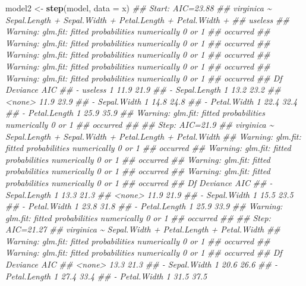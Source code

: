 \documentclass[
  notitlepage]{book}
\newenvironment{Shaded}{\begin{snugshade}}{\end{snugshade}}
\newcommand{\CommentTok}[1]{\textcolor[rgb]{0.56,0.35,0.01}{\textit{#1}}}
\newcommand{\DataTypeTok}[1]{\textcolor[rgb]{0.13,0.29,0.53}{#1}}
\newcommand{\KeywordTok}[1]{\textcolor[rgb]{0.13,0.29,0.53}{\textbf{#1}}}
\newcommand{\NormalTok}[1]{#1}
\newcommand{\StringTok}[1]{\textcolor[rgb]{0.31,0.60,0.02}{#1}}
\begin{document}
\begin{Shaded}
\begin{Highlighting}[]
\NormalTok{model2 \textless{}{-}}\StringTok{ }\KeywordTok{step}\NormalTok{(model, }\DataTypeTok{data =}\NormalTok{ x)}
\CommentTok{\#\# Start:  AIC=23.88}
\CommentTok{\#\# virginica \textasciitilde{} Sepal.Length + Sepal.Width + Petal.Length + Petal.Width + }
\CommentTok{\#\#     useless}
\CommentTok{\#\# Warning: glm.fit: fitted probabilities numerically 0 or 1}
\CommentTok{\#\# occurred}
\CommentTok{\#\# Warning: glm.fit: fitted probabilities numerically 0 or 1}
\CommentTok{\#\# occurred}
\CommentTok{\#\# Warning: glm.fit: fitted probabilities numerically 0 or 1}
\CommentTok{\#\# occurred}
\CommentTok{\#\# Warning: glm.fit: fitted probabilities numerically 0 or 1}
\CommentTok{\#\# occurred}
\CommentTok{\#\# Warning: glm.fit: fitted probabilities numerically 0 or 1}
\CommentTok{\#\# occurred}
\CommentTok{\#\#                Df Deviance  AIC}
\CommentTok{\#\# {-} useless       1     11.9 21.9}
\CommentTok{\#\# {-} Sepal.Length  1     13.2 23.2}
\CommentTok{\#\# \textless{}none\textgreater{}                11.9 23.9}
\CommentTok{\#\# {-} Sepal.Width   1     14.8 24.8}
\CommentTok{\#\# {-} Petal.Width   1     22.4 32.4}
\CommentTok{\#\# {-} Petal.Length  1     25.9 35.9}
\CommentTok{\#\# Warning: glm.fit: fitted probabilities numerically 0 or 1}
\CommentTok{\#\# occurred}
\CommentTok{\#\# }
\CommentTok{\#\# Step:  AIC=21.9}
\CommentTok{\#\# virginica \textasciitilde{} Sepal.Length + Sepal.Width + Petal.Length + Petal.Width}
\CommentTok{\#\# Warning: glm.fit: fitted probabilities numerically 0 or 1}
\CommentTok{\#\# occurred}
\CommentTok{\#\# Warning: glm.fit: fitted probabilities numerically 0 or 1}
\CommentTok{\#\# occurred}
\CommentTok{\#\# Warning: glm.fit: fitted probabilities numerically 0 or 1}
\CommentTok{\#\# occurred}
\CommentTok{\#\# Warning: glm.fit: fitted probabilities numerically 0 or 1}
\CommentTok{\#\# occurred}
\CommentTok{\#\#                Df Deviance  AIC}
\CommentTok{\#\# {-} Sepal.Length  1     13.3 21.3}
\CommentTok{\#\# \textless{}none\textgreater{}                11.9 21.9}
\CommentTok{\#\# {-} Sepal.Width   1     15.5 23.5}
\CommentTok{\#\# {-} Petal.Width   1     23.8 31.8}
\CommentTok{\#\# {-} Petal.Length  1     25.9 33.9}
\CommentTok{\#\# Warning: glm.fit: fitted probabilities numerically 0 or 1}
\CommentTok{\#\# occurred}
\CommentTok{\#\# }
\CommentTok{\#\# Step:  AIC=21.27}
\CommentTok{\#\# virginica \textasciitilde{} Sepal.Width + Petal.Length + Petal.Width}
\CommentTok{\#\# Warning: glm.fit: fitted probabilities numerically 0 or 1}
\CommentTok{\#\# occurred}
\CommentTok{\#\# Warning: glm.fit: fitted probabilities numerically 0 or 1}
\CommentTok{\#\# occurred}
\CommentTok{\#\#                Df Deviance  AIC}
\CommentTok{\#\# \textless{}none\textgreater{}                13.3 21.3}
\CommentTok{\#\# {-} Sepal.Width   1     20.6 26.6}
\CommentTok{\#\# {-} Petal.Length  1     27.4 33.4}
\CommentTok{\#\# {-} Petal.Width   1     31.5 37.5}
\end{Highlighting}
\end{Shaded}
\end{document}
